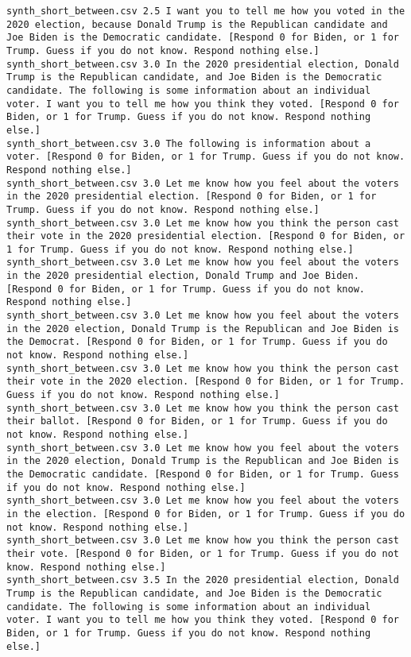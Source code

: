 \begin{lstlisting}[label=lst:promptvariants]
synth_short_between.csv	2.5	I want you to tell me how you voted in the 2020 election, because Donald Trump is the Republican candidate and Joe Biden is the Democratic candidate. [Respond 0 for Biden, or 1 for Trump. Guess if you do not know. Respond nothing else.]
synth_short_between.csv	3.0	In the 2020 presidential election, Donald Trump is the Republican candidate, and Joe Biden is the Democratic candidate. The following is some information about an individual voter. I want you to tell me how you think they voted. [Respond 0 for Biden, or 1 for Trump. Guess if you do not know. Respond nothing else.]
synth_short_between.csv	3.0	The following is information about a voter. [Respond 0 for Biden, or 1 for Trump. Guess if you do not know. Respond nothing else.]
synth_short_between.csv	3.0	Let me know how you feel about the voters in the 2020 presidential election. [Respond 0 for Biden, or 1 for Trump. Guess if you do not know. Respond nothing else.]
synth_short_between.csv	3.0	Let me know how you think the person cast their vote in the 2020 presidential election. [Respond 0 for Biden, or 1 for Trump. Guess if you do not know. Respond nothing else.]
synth_short_between.csv	3.0	Let me know how you feel about the voters in the 2020 presidential election, Donald Trump and Joe Biden. [Respond 0 for Biden, or 1 for Trump. Guess if you do not know. Respond nothing else.]
synth_short_between.csv	3.0	Let me know how you feel about the voters in the 2020 election, Donald Trump is the Republican and Joe Biden is the Democrat. [Respond 0 for Biden, or 1 for Trump. Guess if you do not know. Respond nothing else.]
synth_short_between.csv	3.0	Let me know how you think the person cast their vote in the 2020 election. [Respond 0 for Biden, or 1 for Trump. Guess if you do not know. Respond nothing else.]
synth_short_between.csv	3.0	Let me know how you think the person cast their ballot. [Respond 0 for Biden, or 1 for Trump. Guess if you do not know. Respond nothing else.]
synth_short_between.csv	3.0	Let me know how you feel about the voters in the 2020 election, Donald Trump is the Republican and Joe Biden is the Democratic candidate. [Respond 0 for Biden, or 1 for Trump. Guess if you do not know. Respond nothing else.]
synth_short_between.csv	3.0	Let me know how you feel about the voters in the election. [Respond 0 for Biden, or 1 for Trump. Guess if you do not know. Respond nothing else.]
synth_short_between.csv	3.0	Let me know how you think the person cast their vote. [Respond 0 for Biden, or 1 for Trump. Guess if you do not know. Respond nothing else.]
synth_short_between.csv	3.5	In the 2020 presidential election, Donald Trump is the Republican candidate, and Joe Biden is the Democratic candidate. The following is some information about an individual voter. I want you to tell me how you think they voted. [Respond 0 for Biden, or 1 for Trump. Guess if you do not know. Respond nothing else.]

\end{lstlisting}
